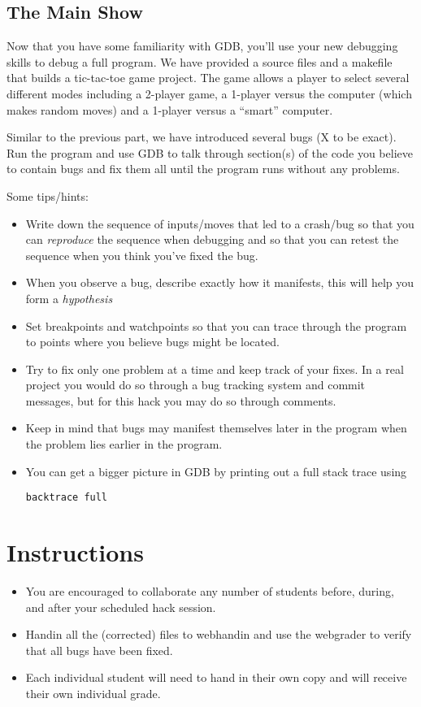 \documentclass[12pt]{scrartcl}
\begin{document}
\subsection*{The Main Show}

Now that you have some familiarity with GDB, you'll use your new debugging
skills to debug a full program.  We have provided a source files and a 
makefile that builds a tic-tac-toe game project.  The game allows a player
to select several different modes including a 2-player game, a 1-player 
versus the computer (which makes random moves) and a 1-player versus 
a ``smart'' computer.

Similar to the previous part, we have introduced several bugs (X to be exact).
Run the program and use GDB to talk through section(s) of the code you believe
to contain bugs and fix them all until the program runs without any problems.

Some tips/hints:
\begin{itemize}
  \item Write down the sequence of inputs/moves that led to a crash/bug 
  so that you can \emph{reproduce} the sequence when debugging and so that
  you can retest the sequence when you think you've fixed the bug.
  \item When you observe a bug, describe exactly how it manifests, this 
  will help you form a \emph{hypothesis} 
  \item Set breakpoints and watchpoints so that you can trace through
  the program to points where you believe bugs might be located.
  \item Try to fix only one problem at a time and keep track of your
  fixes.  In a real project you would do so through a bug tracking system
  and commit messages, but for this hack you may do so through comments.
  \item Keep in mind that bugs may manifest themselves later in the program
  when the problem lies earlier in the program.
  \item You can get a bigger picture in GDB by printing out a full stack trace
  using 
  
  \texttt{backtrace full}

\end{itemize}  

\section*{Instructions}

\begin{itemize}
  \item You are encouraged to collaborate any number of students 
  before, during, and after your scheduled hack session.  
  \item Handin all the (corrected) files to webhandin and use
  the webgrader to verify that all bugs have been fixed.
  \item Each individual student will need
  to hand in their own copy and will receive their own individual
  grade.
\end{itemize}
  
\end{document}
